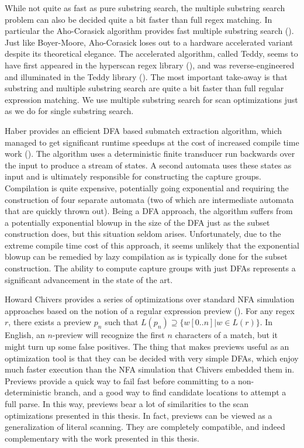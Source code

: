 While not quite as fast as pure substring search, the multiple
substring search problem can also be decided quite a bit faster than
full regex matching. In particular the Aho-Corasick algorithm provides
fast multiple substring search (\cite{Aho1975}). Just like Boyer-Moore,
Aho-Corasick loses out to a hardware accelerated variant despite its
theoretical elegance. The accelerated algorithm, called Teddy, seems
to have first appeared in the hyperscan regex library (\cite{hyperscan}),
and was reverse-engineered and illuminated in the Teddy library (\cite{Teddy}).
The most important take-away is that substring and multiple
substring search are quite a bit faster than full regular expression matching.
We use multiple substring search for scan optimizations just as we do for
single substring search.

Haber provides an efficient DFA based submatch extraction algorithm,
which managed to get significant runtime speedups at the cost of
increased compile time work (\cite{Haber2013}). The algorithm uses
a deterministic finite transducer run backwards over the input
to produce a stream of states. A second automata uses these
states as input and is ultimately responsible for constructing
the capture groups. Compilation is quite expensive, potentially
going exponential and requiring the construction of four separate
automata (two of which are intermediate automata that are quickly
thrown out). Being a DFA approach, the algorithm suffers from
a potentially exponential blowup in the size of the DFA just as
the subset construction does, but this situation seldom arises.
Unfortunately, due to the extreme compile time cost of this
approach, it seems unlikely that the exponential blowup can be
remedied by lazy compilation as is typically done for the subset
construction. The ability to compute capture groups with
just DFAs represents a significant advancement in the state of the art.

Howard Chivers provides a series of optimizations over standard NFA
simulation approaches based on the notion of a regular expression preview
(\cite{Chivers2016}). For any regex $r$, there exists a preview $p_n$
such that $L(p_n) \supseteq \{ w[0..n] | w \in L(r) \}$. In English,
an $n$-preview will recognize the first $n$ characters
of a match, but it might turn up some false positives. The thing that
makes previews useful as an optimization tool is that they can be
decided with very simple DFAs, which enjoy much faster execution than
the NFA simulation that Chivers embedded them in. Previews provide
a quick way to fail fast before committing to a non-deterministic
branch, and a good way to find candidate locations to attempt a
full parse. In this way, previews bear a lot of similarities to the
scan optimizations presented in this thesis. In fact, previews can be
viewed as a generalization of literal scanning. They are completely
compatible, and indeed complementary with the work presented in this
thesis.


